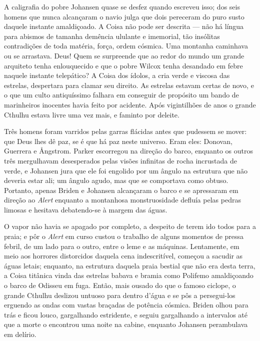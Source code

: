 A caligrafia do pobre Johansen quase se desfez quando escreveu isso; dos
seis homens que nunca alcançaram o navio julga que dois pereceram do
puro susto daquele instante amaldiçoado. A Coisa não pode ser descrita
--- não há língua para abismos de tamanha demência ululante e imemorial,
tão insólitas contradições de toda matéria, força, ordem cósmica. Uma
montanha caminhava ou se arrastava. Deus! Quem se surpreende que ao
redor do mundo um grande arquiteto tenha enlouquecido e que o pobre
Wilcox tenha desandado em febre naquele instante telepático? A Coisa dos
ídolos, a cria verde e viscosa das estrelas, despertara para clamar seu
direito. As estrelas estavam certas de novo, e o que um culto
antiquíssimo falhara em conseguir de propósito um bando de marinheiros
inocentes havia feito por acidente. Após vigintilhões de anos o grande
Cthulhu estava livre uma vez mais, e faminto por deleite.

Três homens foram varridos pelas garras flácidas antes que pudessem se
mover: que Deus lhes dê paz, se é que há paz neste universo. Eram eles:
Donovan, Guerrera e Ångstrom. Parker escorregou na direção do barco,
enquanto os outros três mergulhavam desesperados pelas visões infinitas
de rocha incrustada de verde, e Johansen jura que ele foi engolido por
um ângulo na estrutura que não deveria estar ali; um ângulo agudo, mas
que se comportava como obtuso. Portanto, apenas Briden e Johansen
alcançaram o barco e se apressaram em direção ao \emph{Alert} enquanto
a montanhosa monstruosidade defluía pelas pedras limosas e hesitava
debatendo-se à margem das águas.

O vapor não havia se apagado por completo, a despeito de terem ido todos
para a praia; e pôr o \emph{Alert} em curso custou o trabalho de alguns
momentos de pressa febril, de um lado para o outro, entre o leme e as
máquinas. Lentamente, em meio aos horrores distorcidos daquela cena
indescritível, começou a sacudir as águas letais; enquanto, na estrutura
daquela praia bestial que não era desta terra, a Coisa titânica vinda
das estrelas babava e bramia como Polifemo amaldiçoando o barco de
Odisseu em fuga. Então, mais ousado do que o famoso ciclope, o grande
Cthulhu deslizou untuoso para dentro d'água e se pôs a persegui-los
erguendo as ondas com vastas braçadas de potência cósmica. Briden olhou
para trás e ficou louco, gargalhando estridente, e seguiu gargalhando a
intervalos até que a morte o encontrou uma noite na cabine, enquanto
Johansen perambulava em delírio.

